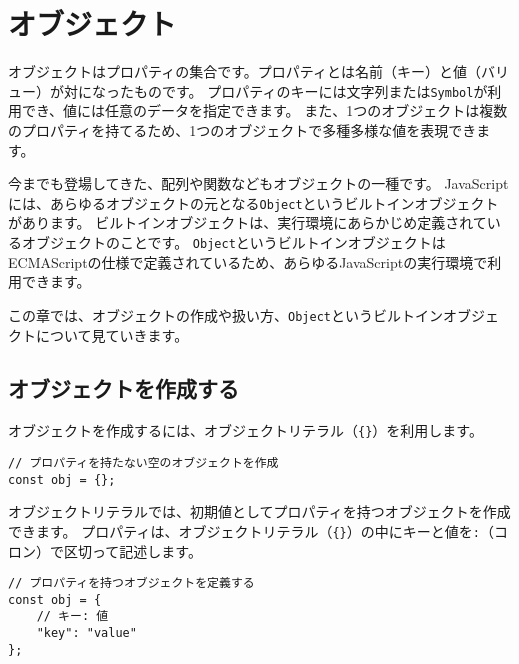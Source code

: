 \hypertarget{object}{%
\chapter{オブジェクト}\label{object}}
\thispagestyle{frontheadings}

オブジェクトはプロパティの集合です。プロパティとは名前（キー）と値（バリュー）が対になったものです。
プロパティのキーには文字列または\texttt{Symbol}が利用でき、値には任意のデータを指定できます。
また、1つのオブジェクトは複数のプロパティを持てるため、1つのオブジェクトで多種多様な値を表現できます。

今までも登場してきた、配列や関数などもオブジェクトの一種です。
JavaScriptには、あらゆるオブジェクトの元となる\texttt{Object}というビルトインオブジェクトがあります。
ビルトインオブジェクトは、実行環境にあらかじめ定義されているオブジェクトのことです。
\texttt{Object}というビルトインオブジェクトはECMAScriptの仕様で定義されているため、あらゆるJavaScriptの実行環境で利用できます。

この章では、オブジェクトの作成や扱い方、\texttt{Object}というビルトインオブジェクトについて見ていきます。

\hypertarget{create-object}{%
\section{オブジェクトを作成する}\label{create-object}}

オブジェクトを作成するには、オブジェクトリテラル（\texttt{\{\}}）を利用します。

\begin{lstlisting}
// プロパティを持たない空のオブジェクトを作成
const obj = {};
\end{lstlisting}

オブジェクトリテラルでは、初期値としてプロパティを持つオブジェクトを作成できます。
プロパティは、オブジェクトリテラル（\texttt{\{\}}）の中にキーと値を\texttt{:}（コロン）で区切って記述します。

\begin{lstlisting}
// プロパティを持つオブジェクトを定義する
const obj = {
    // キー: 値
    "key": "value"
};
\end{lstlisting}


